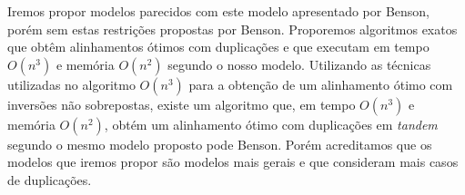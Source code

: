 Iremos propor modelos parecidos com este modelo apresentado por Benson, porém sem
estas restrições propostas por Benson. Proporemos 
algoritmos exatos que obtêm alinhamentos ótimos com duplicações e
que executam em tempo $O(n^3)$ e memória $O(n^2)$ segundo o nosso modelo.
Utilizando
as técnicas utilizadas no algoritmo $O(n^3)$ para a obtenção de um alinhamento
ótimo com inversões não sobrepostas, existe um algoritmo que, em tempo $O(n^3)$ e memória
$O(n^2)$, obtém um alinhamento ótimo com duplicações em \emph{tandem} segundo o mesmo
modelo proposto pode Benson. Porém acreditamos que os modelos que iremos propor
são modelos mais gerais e que consideram mais casos de duplicações. 
